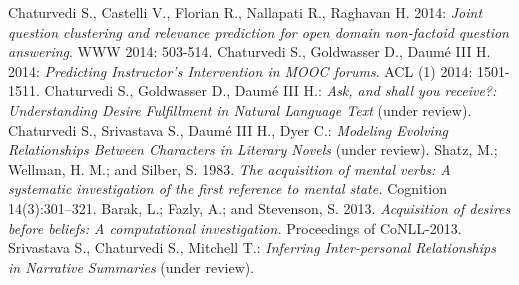 \documentclass[9.8pt, twocolumn]{article}
\begin{document}
\begin{thebibliography}{10} %
\scriptsize{
 Chaturvedi S., Castelli V., Florian R., Nallapati R., Raghavan H. 2014:
\emph{Joint question clustering and relevance prediction for open domain non-factoid question answering}. WWW 2014: 503-514.
 Chaturvedi S., Goldwasser D., Daumé III H. 2014: \emph{Predicting Instructor's Intervention in MOOC forums}. ACL (1) 2014: 1501-1511.
 Chaturvedi S., Goldwasser D., Daumé III H.: \emph{Ask, and shall you receive?: Understanding Desire Fulfillment in Natural Language Text} (under review).
 Chaturvedi S., Srivastava S., Daumé III H., Dyer C.: \emph{Modeling Evolving Relationships Between Characters in Literary Novels} (under review).
 Shatz, M.; Wellman, H. M.; and Silber, S. 1983. \emph{The acquisition of mental verbs: A systematic investigation of the first reference to mental state.} Cognition 14(3):301–321.
 Barak, L.; Fazly, A.; and Stevenson, S. 2013. \emph{Acquisition of desires before beliefs: A computational investigation.} Proceedings of CoNLL-2013.
 Srivastava S., Chaturvedi S., Mitchell T.: \emph{Inferring Inter-personal Relationships in Narrative Summaries} (under review).
}
\end{thebibliography}


\newpage

\end{document}
